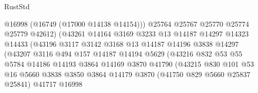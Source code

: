 \begin{lexlean}{RustStd}
\begin{coremodule}
                                    @16998
                                    (@16749 (@17000 @14138 @14154)))
                                  @25764
                                  @25767
                                  @25770
                                  @25774
                                  @25779
                                  @42612)
                                (@43261
                                  @14164
                                  @3169
                                  @3233
                                  @13
                                  @14187
                                  @14297
                                  @14323
                                  @14433
                                  (@43196
                                    @3117
                                    @3142
                                    @3168
                                    @13
                                    @14187
                                    @14196
                                    @3838
                                    @14297
                                    (@43207
                                      @3116
                                      @494
                                      @157
                                      @14187
                                      @14194
                                      @5629
                                      (@43216
                                        @832
                                        @53
                                        @55
                                        @5784
                                        @14186
                                        @14193
                                        @3864
                                        @14169
                                        @3870
                                        @41790
                                        (@43215
                                          @830
                                          @101
                                          @53
                                          @16
                                          @5660
                                          @3838
                                          @3850
                                          @3864
                                          @14179
                                          @3870
                                          (@41750 @829 @5660 @25837 @25841)
                                          @41717
                                          @16998

\end{coremodule}
\end{lexlean}

